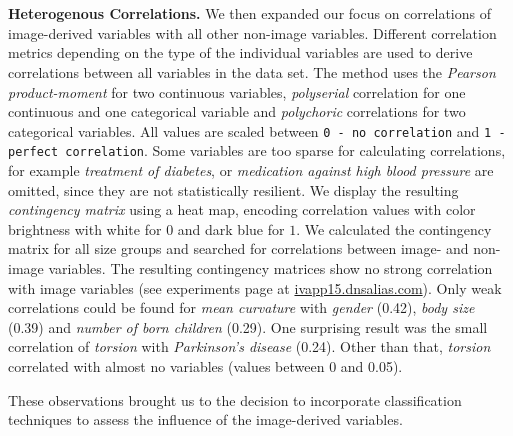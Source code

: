 \documentclass[a4paper,twoside]{style/article}
\begin{document}
\\\\
\noindent \textbf{Heterogenous Correlations.}
We then expanded our focus on correlations of image-derived variables with all other non-image variables.
Different correlation metrics depending on the type of the individual variables are used to derive correlations between all variables in the data set.
The method uses the \emph{Pearson product-moment} for two continuous variables, \emph{polyserial} correlation for one continuous and one categorical variable and \emph{polychoric} correlations for two categorical variables.
All values are scaled between \texttt{0 - no correlation} and \texttt{1 - perfect correlation}.
Some variables are too sparse for calculating correlations, for example \emph{treatment of diabetes}, or \emph{medication against high blood pressure} are omitted, since they are not statistically resilient.
We display the resulting \emph{contingency matrix} using a heat map, encoding correlation values with color brightness with white for $0$ and dark blue for $1$.
We calculated the contingency matrix for all size groups and searched for correlations between image- and non-image variables.
The resulting contingency matrices show no strong correlation with image variables (see experiments page at \url{ivapp15.dnsalias.com}).
Only weak correlations could be found for \emph{mean curvature} with \emph{gender} (0.42), \emph{body size} (0.39) and \emph{number of born children} (0.29).
One surprising result was the small correlation of \emph{torsion} with \emph{Parkinson's disease} (0.24).
Other than that, \emph{torsion} correlated with almost no variables (values between 0 and 0.05).

These observations brought us to the decision to incorporate classification techniques to assess the influence of the image-derived variables.
\end{document}
